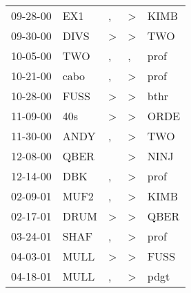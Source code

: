 \begin{supertabular}{p{0.07\textwidth}p{0.06\textwidth}p{0.02\textwidth}p{0.02\textwidth}p{0.06\textwidth}}
          09-28-00\textsuperscript{} &            EX1\textsuperscript{} &                , &     \textgreater &           KIMB\textsuperscript{} \\
          09-30-00\textsuperscript{} &           DIVS\textsuperscript{} &     \textgreater &     \textgreater &            TWO\textsuperscript{} \\
          10-05-00\textsuperscript{} &            TWO\textsuperscript{} &                , &                , &           prof\textsuperscript{} \\
          10-21-00\textsuperscript{} &           cabo\textsuperscript{} &                , &     \textgreater &           prof\textsuperscript{} \\
          10-28-00\textsuperscript{} &           FUSS\textsuperscript{} &     \textgreater &     \textgreater &           bthr\textsuperscript{} \\
          11-09-00\textsuperscript{} &            40s\textsuperscript{} &     \textgreater &     \textgreater &           ORDE\textsuperscript{} \\
          11-30-00\textsuperscript{} &           ANDY\textsuperscript{} &                , &     \textgreater &            TWO\textsuperscript{} \\
          12-08-00\textsuperscript{} &           QBER\textsuperscript{} &                  &     \textgreater &           NINJ\textsuperscript{} \\
          12-14-00\textsuperscript{} &            DBK\textsuperscript{} &                , &     \textgreater &           prof\textsuperscript{} \\
          02-09-01\textsuperscript{} &           MUF2\textsuperscript{} &                , &     \textgreater &           KIMB\textsuperscript{} \\
          02-17-01\textsuperscript{} &           DRUM\textsuperscript{} &     \textgreater &     \textgreater &           QBER\textsuperscript{} \\
          03-24-01\textsuperscript{} &           SHAF\textsuperscript{} &                , &     \textgreater &           prof\textsuperscript{} \\
          04-03-01\textsuperscript{} &           MULL\textsuperscript{} &     \textgreater &     \textgreater &           FUSS\textsuperscript{} \\
          04-18-01\textsuperscript{} &           MULL\textsuperscript{} &                , &     \textgreater &           pdgt\textsuperscript{} \\

\end{supertabular}
